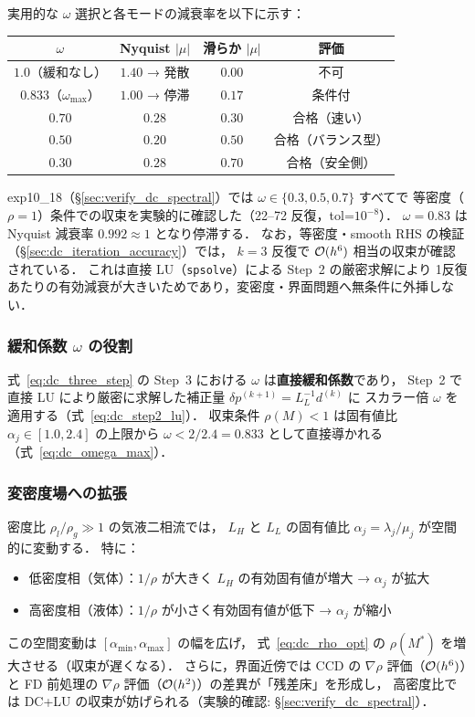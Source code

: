実用的な $\omega$ 選択と各モードの減衰率を以下に示す：

\begin{center}
\PaperTableSetup
\begin{tabular}{cccc}
\toprule
$\omega$ & Nyquist $|\mu|$ & 滑らか $|\mu|$ & 評価 \\
\midrule
$1.0$（緩和なし） & $1.40$ → 発散 & $0.00$ & 不可 \\
$0.833$（$\omega_{\max}$） & $1.00$ → 停滞 & $0.17$ & 条件付 \\
$0.70$ & $0.28$ & $0.30$ & 合格（速い） \\
$\mathbf{0.50}$ & $\mathbf{0.20}$ & $\mathbf{0.50}$ & 合格（バランス型） \\
$0.30$ & $0.28$ & $0.70$ & 合格（安全側） \\
\bottomrule
\end{tabular}
\end{center}

exp10\_18（§\ref{sec:verify_dc_spectral}）では $\omega \in \{0.3, 0.5, 0.7\}$ すべてで
等密度（$\rho=1$）条件での収束を実験的に確認した（22--72 反復，tol=$10^{-8}$）．
$\omega = 0.83$ は Nyquist 減衰率 $0.992 \approx 1$ となり停滞する．
なお，等密度・smooth RHS の検証（§\ref{sec:dc_iteration_accuracy}）では，
$k = 3$ 反復で $\mathcal{O}(h^6)$ 相当の収束が確認されている．
これは直接 LU（\texttt{spsolve}）による Step~2 の厳密求解により
1反復あたりの有効減衰が大きいためであり，変密度・界面問題へ無条件に外挿しない．

\subsubsection*{緩和係数 \texorpdfstring{$\omega$}{omega} の役割}

式~\eqref{eq:dc_three_step} の Step~3 における $\omega$ は\textbf{直接緩和係数}であり，
Step~2 で直接 LU により厳密に求解した補正量 $\delta p^{(k+1)} = L_L^{-1} d^{(k)}$ に
スカラー倍 $\omega$ を適用する（式~\eqref{eq:dc_step2_lu}）．
収束条件 $\rho(M) < 1$ は固有値比 $\alpha_j \in [1.0, 2.4]$ の上限から
$\omega < 2/2.4 = 0.833$ として直接導かれる（式~\eqref{eq:dc_omega_max}）．

\subsubsection*{変密度場への拡張}

密度比 $\rho_l/\rho_g \gg 1$ の気液二相流では，
$L_H$ と $L_L$ の固有値比 $\alpha_j = \lambda_j/\mu_j$ が空間的に変動する．
特に：
\begin{itemize}
  \item 低密度相（気体）：$1/\rho$ が大きく $L_H$ の有効固有値が増大 → $\alpha_j$ が拡大
  \item 高密度相（液体）：$1/\rho$ が小さく有効固有値が低下 → $\alpha_j$ が縮小
\end{itemize}
この空間変動は $[\alpha_{\min}, \alpha_{\max}]$ の幅を広げ，
式~\eqref{eq:dc_rho_opt} の $\rho(M^*)$ を増大させる（収束が遅くなる）．
さらに，界面近傍では CCD の $\nabla\rho$ 評価（$\mathcal{O}(h^6)$）と
FD 前処理の $\nabla\rho$ 評価（$\mathcal{O}(h^2)$）の差異が「残差床」を形成し，
高密度比では DC+LU の収束が妨げられる（実験的確認: §\ref{sec:verify_dc_spectral}）．

